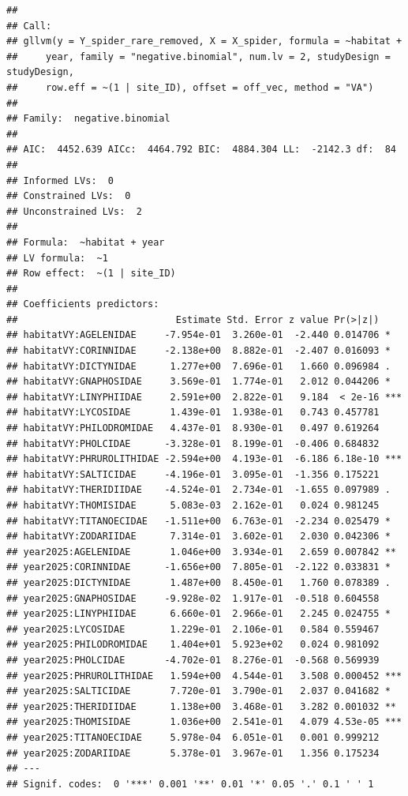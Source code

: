 \documentclass[
]{article}
\begin{document}
\begin{verbatim}
## 
## Call:
## gllvm(y = Y_spider_rare_removed, X = X_spider, formula = ~habitat + 
##     year, family = "negative.binomial", num.lv = 2, studyDesign = studyDesign, 
##     row.eff = ~(1 | site_ID), offset = off_vec, method = "VA")
## 
## Family:  negative.binomial 
## 
## AIC:  4452.639 AICc:  4464.792 BIC:  4884.304 LL:  -2142.3 df:  84 
## 
## Informed LVs:  0 
## Constrained LVs:  0 
## Unconstrained LVs:  2 
## 
## Formula:  ~habitat + year 
## LV formula:  ~1 
## Row effect:  ~(1 | site_ID) 
## 
## Coefficients predictors:
##                            Estimate Std. Error z value Pr(>|z|)    
## habitatVY:AGELENIDAE     -7.954e-01  3.260e-01  -2.440 0.014706 *  
## habitatVY:CORINNIDAE     -2.138e+00  8.882e-01  -2.407 0.016093 *  
## habitatVY:DICTYNIDAE      1.277e+00  7.696e-01   1.660 0.096984 .  
## habitatVY:GNAPHOSIDAE     3.569e-01  1.774e-01   2.012 0.044206 *  
## habitatVY:LINYPHIIDAE     2.591e+00  2.822e-01   9.184  < 2e-16 ***
## habitatVY:LYCOSIDAE       1.439e-01  1.938e-01   0.743 0.457781    
## habitatVY:PHILODROMIDAE   4.437e-01  8.930e-01   0.497 0.619264    
## habitatVY:PHOLCIDAE      -3.328e-01  8.199e-01  -0.406 0.684832    
## habitatVY:PHRUROLITHIDAE -2.594e+00  4.193e-01  -6.186 6.18e-10 ***
## habitatVY:SALTICIDAE     -4.196e-01  3.095e-01  -1.356 0.175221    
## habitatVY:THERIDIIDAE    -4.524e-01  2.734e-01  -1.655 0.097989 .  
## habitatVY:THOMISIDAE      5.083e-03  2.162e-01   0.024 0.981245    
## habitatVY:TITANOECIDAE   -1.511e+00  6.763e-01  -2.234 0.025479 *  
## habitatVY:ZODARIIDAE      7.314e-01  3.602e-01   2.030 0.042306 *  
## year2025:AGELENIDAE       1.046e+00  3.934e-01   2.659 0.007842 ** 
## year2025:CORINNIDAE      -1.656e+00  7.805e-01  -2.122 0.033831 *  
## year2025:DICTYNIDAE       1.487e+00  8.450e-01   1.760 0.078389 .  
## year2025:GNAPHOSIDAE     -9.928e-02  1.917e-01  -0.518 0.604558    
## year2025:LINYPHIIDAE      6.660e-01  2.966e-01   2.245 0.024755 *  
## year2025:LYCOSIDAE        1.229e-01  2.106e-01   0.584 0.559467    
## year2025:PHILODROMIDAE    1.404e+01  5.923e+02   0.024 0.981092    
## year2025:PHOLCIDAE       -4.702e-01  8.276e-01  -0.568 0.569939    
## year2025:PHRUROLITHIDAE   1.594e+00  4.544e-01   3.508 0.000452 ***
## year2025:SALTICIDAE       7.720e-01  3.790e-01   2.037 0.041682 *  
## year2025:THERIDIIDAE      1.138e+00  3.468e-01   3.282 0.001032 ** 
## year2025:THOMISIDAE       1.036e+00  2.541e-01   4.079 4.53e-05 ***
## year2025:TITANOECIDAE     5.978e-04  6.051e-01   0.001 0.999212    
## year2025:ZODARIIDAE       5.378e-01  3.967e-01   1.356 0.175234    
## ---
## Signif. codes:  0 '***' 0.001 '**' 0.01 '*' 0.05 '.' 0.1 ' ' 1
\end{verbatim}
\end{document}
